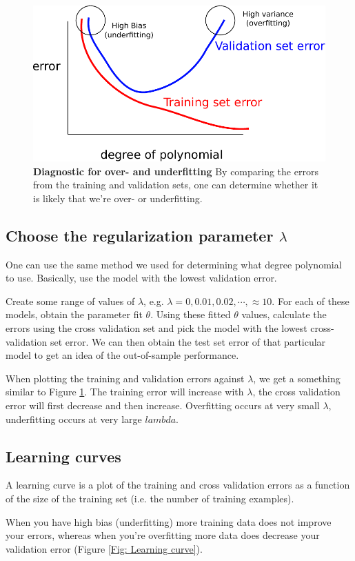 \documentclass[a4paper, 10pt,hidelinks]{article}
\begin{document}
\begin{figure}[h!]
\includegraphics[width=0.6\linewidth]{OverUnder_Diagnostic}
\caption{\footnotesize{\textbf{Diagnostic for over- and underfitting} By comparing the errors from the training and validation sets, one can determine whether it is likely that we're over- or underfitting.}}
\label{Fig: OverUnder Diagnostic}
\end{figure}

\subsection{Choose the regularization parameter $\lambda$}
One can use the same method we used for determining what degree polynomial to use. Basically, use the model with the lowest validation error. 

Create some range of values of $\lambda$, e.g. $\lambda = 0, 0.01, 0.02, \cdots, \approx 10$. For each of these models, obtain the parameter fit $\theta$. Using these fitted $\theta$ values, calculate the errors using the cross validation set and pick the model with the lowest cross-validation set error. We can then obtain the test set error of that particular model to get an idea of the out-of-sample performance. 

When plotting the training and validation errors against $\lambda$, we get a something similar to Figure \ref{Fig: OverUnder Diagnostic}. The training error will increase with $\lambda$, the cross validation error will first decrease and then increase. Overfitting occurs at very small $\lambda$, underfitting occurs at very large $lambda$.

\subsection{Learning curves}
A learning curve is a plot of the training and cross validation errors as a function of the size of the training set (i.e. the number of training examples).

When you have high bias (underfitting) more training data does not improve your errors, whereas when you're overfitting more data does decrease your validation error (Figure \ref{Fig: Learning curve}). 
\end{document}
